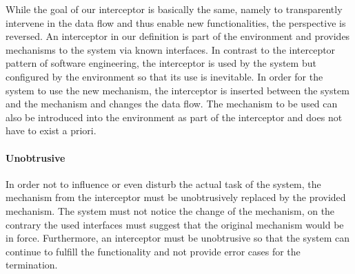 While the goal of our interceptor is basically the same, namely to transparently intervene in the data flow and thus enable new functionalities, the perspective is reversed.
An interceptor in our definition is part of the environment and provides mechanisms to the system via known interfaces. 
In contrast to the interceptor pattern of software engineering, the interceptor is used by the system but configured by the environment so that its use is inevitable.
In order for the system to use the new mechanism, the interceptor is inserted between the system and the mechanism and changes the data flow.
The mechanism to be used can also be introduced into the environment as part of the interceptor and does not have to exist a priori. 


\paragraph{Unobtrusive}
In order not to influence or even disturb the actual task of the system, the mechanism from the interceptor must be unobtrusively replaced by the provided mechanism.
The system must not notice the change of the mechanism, on the contrary the used interfaces must suggest that the original mechanism would be in force.
Furthermore, an interceptor must be unobtrusive so that the system can continue to fulfill the functionality and not provide error cases for the termination.







































